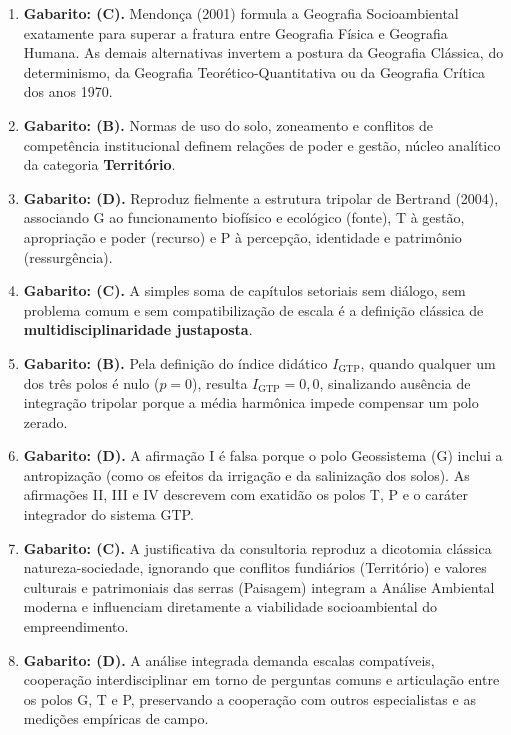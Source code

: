 \begin{boxGabarito}
\begin{enumerate}[leftmargin=1.8em, itemsep=3.5pt, start=11]
  \item \textbf{Gabarito: (C).} Mendonça (2001) formula a Geografia Socioambiental exatamente para superar a fratura entre Geografia Física e Geografia Humana. As demais alternativas invertem a postura da Geografia Clássica, do determinismo, da Geografia Teorético-Quantitativa ou da Geografia Crítica dos anos 1970.
  \item \textbf{Gabarito: (B).} Normas de uso do solo, zoneamento e conflitos de competência institucional definem relações de poder e gestão, núcleo analítico da categoria \textbf{Território}.
  \item \textbf{Gabarito: (D).} Reproduz fielmente a estrutura tripolar de Bertrand (2004), associando G ao funcionamento biofísico e ecológico (fonte), T à gestão, apropriação e poder (recurso) e P à percepção, identidade e patrimônio (ressurgência).
  \item \textbf{Gabarito: (C).} A simples soma de capítulos setoriais sem diálogo, sem problema comum e sem compatibilização de escala é a definição clássica de \textbf{multidisciplinaridade justaposta}.
  \item \textbf{Gabarito: (B).} Pela definição do índice didático $I_{\text{GTP}}$, quando qualquer um dos três polos é nulo ($p = 0$), resulta $I_{\text{GTP}} = 0{,}0$, sinalizando ausência de integração tripolar porque a média harmônica impede compensar um polo zerado.
  \item \textbf{Gabarito: (D).} A afirmação I é falsa porque o polo Geossistema (G) inclui a antropização (como os efeitos da irrigação e da salinização dos solos). As afirmações II, III e IV descrevem com exatidão os polos T, P e o caráter integrador do sistema GTP.
  \item \textbf{Gabarito: (C).} A justificativa da consultoria reproduz a dicotomia clássica natureza-sociedade, ignorando que conflitos fundiários (Território) e valores culturais e patrimoniais das serras (Paisagem) integram a Análise Ambiental moderna e influenciam diretamente a viabilidade socioambiental do empreendimento.
  \item \textbf{Gabarito: (D).} A análise integrada demanda escalas compatíveis, cooperação interdisciplinar em torno de perguntas comuns e articulação entre os polos G, T e P, preservando a cooperação com outros especialistas e as medições empíricas de campo.
\end{enumerate}
\end{boxGabarito}


